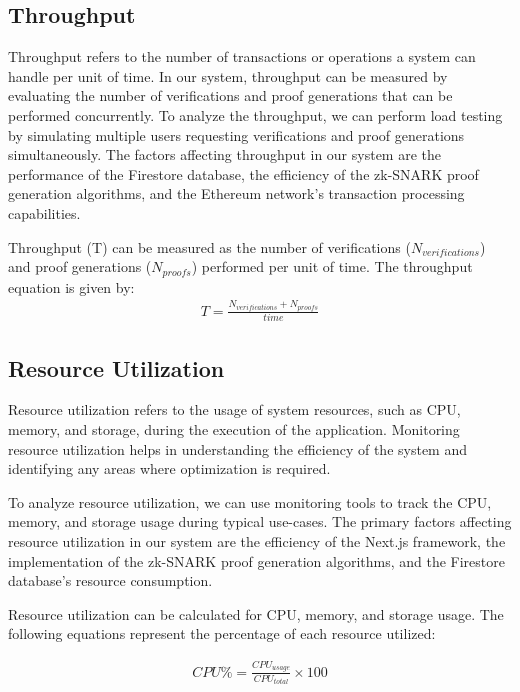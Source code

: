 \subsection{Throughput}
Throughput refers to the number of transactions or operations a system can handle per unit of time. In our system, throughput can be measured by evaluating the number of verifications and proof generations that can be performed concurrently. To analyze the throughput, we can perform load testing by simulating multiple users requesting verifications and proof generations simultaneously.
The factors affecting throughput in our system are the performance of the Firestore database, the efficiency of the zk-SNARK proof generation algorithms, and the Ethereum network's transaction processing capabilities.

Throughput (T) can be measured as the number of verifications ($N_{verifications}$) and proof generations ($N_{proofs}$) performed per unit of time. The throughput equation is given by:
\begin{align}
T = \frac{N_{verifications} + N_{proofs}}{time}\label{EqThroughput}
\end{align}

\subsection{Resource Utilization}
Resource utilization refers to the usage of system resources, such as CPU, memory, and storage, during the execution of the application. Monitoring resource utilization helps in understanding the efficiency of the system and identifying any areas where optimization is required.

To analyze resource utilization, we can use monitoring tools to track the CPU, memory, and storage usage during typical use-cases. The primary factors affecting resource utilization in our system are the efficiency of the Next.js framework, the implementation of the zk-SNARK proof generation algorithms, and the Firestore database's resource consumption.

Resource utilization can be calculated for CPU, memory, and storage usage. The following equations represent the percentage of each resource utilized:

\begin{align}
CPU\% = \frac{CPU_{usage}}{CPU_{total}} \times 100\label{EqCPU}
\end{align}


